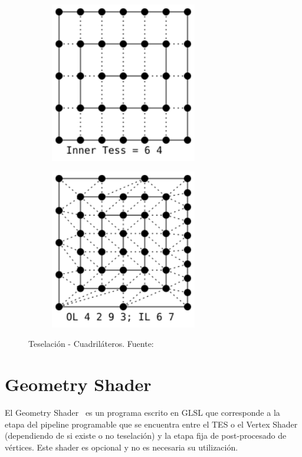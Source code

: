 \begin{figure}
\begin{subfigure}{0.40\textwidth}
	\end{subfigure}
	\hfill
	\begin{subfigure}{0.40\textwidth}
			\includegraphics[height=7cm,width=\textwidth]{figures/QuadInnerOnlyLineCorr.png}	
	\end{subfigure}
	\newline
	\begin{subfigure}{0.40\textwidth}
			\includegraphics[height=7cm,width=\textwidth]{figures/QuadFull.png}	
	\end{subfigure}
	\caption[Teselación - Cuadriláteros.]{Teselación - Cuadriláteros.
	Fuente:~\cite{TessellationImages}}
	\label{fig:quadtessellation}
\end{figure}

\section{Geometry Shader}
\label{ref:GeoShader}

El Geometry Shader~\cite{GeoShader} es un programa escrito en GLSL que
corresponde a la etapa del pipeline programable que se encuentra entre el TES o
el Vertex Shader (dependiendo de si existe o no teselación) y la etapa fija de
post-procesado de vértices. Este shader es opcional y no es necesaria su
utilización.

